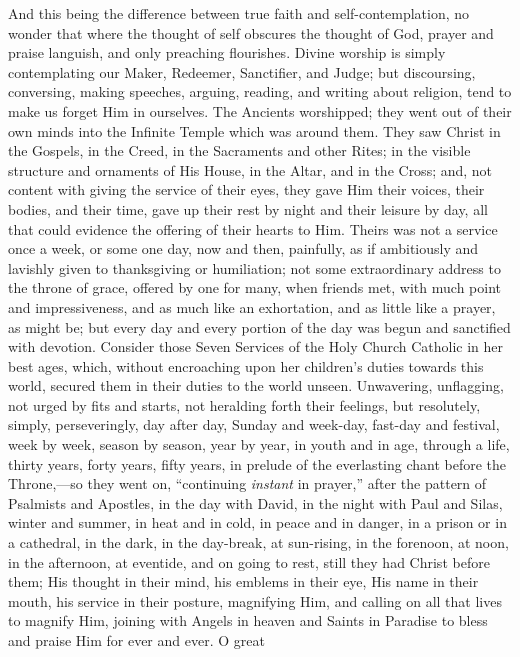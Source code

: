 And this being the difference between true faith and
self-contemplation, no wonder that where the thought of self obscures
the thought of God, prayer and praise languish, and only preaching
flourishes. Divine worship is simply contemplating our Maker,
Redeemer, Sanctifier, and Judge; but discoursing, conversing, making
speeches, arguing, reading, and writing about religion, tend to make
us forget Him in ourselves. The Ancients worshipped; they went out of
their own minds into the Infinite Temple which was around them. They
saw Christ in the Gospels, in the Creed, in the Sacraments and other
Rites; in the visible structure and ornaments of His House, in the
Altar, and in the Cross; and, not content with giving the service of
their eyes, they gave Him their voices, their bodies, and their
time, gave up their rest by night and their leisure by day, all that
could evidence the offering of their hearts to Him. Theirs was not a
service once a week, or some one day, now and then, painfully, as if
ambitiously and lavishly given to thanksgiving or humiliation; not
some extraordinary address to the throne of grace, offered by one for
many, when friends met, with much point and impressiveness, and as
much like an exhortation, and as little like a prayer, as might be;
but every day and every portion of the day was begun and sanctified
with devotion. Consider those Seven Services of the Holy Church
Catholic in her best ages, which, without encroaching upon her
children's duties towards this world, secured them in their duties to
the world unseen. Unwavering, unflagging, not urged by fits and
starts, not heralding forth their feelings, but resolutely, simply,
perseveringly, day after day, Sunday and week-day, fast-day and
festival, week by week, season by season, year by year, in youth and
in age, through a life, thirty years, forty years, fifty years, in
prelude of the everlasting chant before the Throne,—so they went on,
``continuing \emph{instant} in prayer,'' after the pattern of
Psalmists and Apostles, in the day with David, in the night with Paul
and Silas, winter and summer, in heat and in cold, in peace and in
danger, in a prison or in a cathedral, in the dark, in the day-break,
at sun-rising, in the forenoon, at noon, in the afternoon, at
eventide, and on going to rest, still they had Christ before them; His
thought in their mind, his emblems in their eye, His name in their
mouth, his service in their posture, magnifying Him, and calling
on all that lives to magnify Him, joining with Angels in heaven and
Saints in Paradise to bless and praise Him for ever and ever. O great

